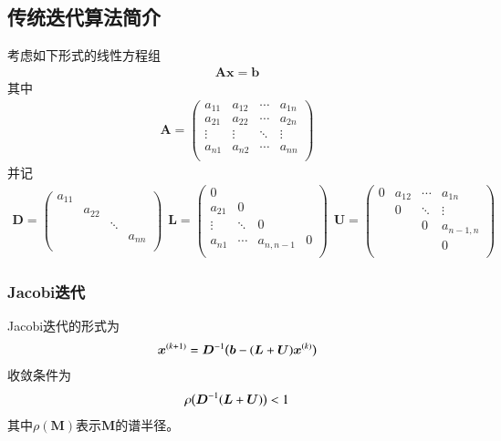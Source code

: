 \subsection{传统迭代算法简介}
考虑如下形式的线性方程组
\begin{align}
  \bm{A}\bm{x}=\bm{b}
\end{align}
其中
\begin{align}
  \bm{A}=\begin{pmatrix}
  a_{11} & a_{12} & \cdots & a_{1n}\\
  a_{21} & a_{22} & \cdots & a_{2n}\\
  \vdots & \vdots & \ddots & \vdots\\
  a_{n1} & a_{n2} & \cdots & a_{nn}\\
  \end{pmatrix}
\end{align}
并记
\begin{align}
  \bm{D}=\begin{pmatrix}
      a_{11} &  &  & \\
       & a_{22} &  & \\
       &  & \ddots & \\
       &  &  & a_{nn}\\
      \end{pmatrix}
  \hspace{5pt}
  \bm{L}=\begin{pmatrix}
    0 &  &  & \\
    a_{21} & 0 &  & \\
    \vdots & \ddots & 0 & \\
    a_{n1} & \cdots & a_{n,n-1} & 0\\
    \end{pmatrix}
  \hspace{5pt}
  \bm{U}=\begin{pmatrix}
      0 & a_{12} & \cdots & a_{1n}\\
       & 0 & \ddots & \vdots\\
       &  & 0 & a_{n-1,n}\\
       &  &  & 0\\
      \end{pmatrix}
\end{align}

\subsubsection{Jacobi迭代}
Jacobi迭代的形式为
\begin{align}
  \bm{x}^{(k+1)}=\bm{D}^{-1}\pb[b]{\bm{b}-\pb{\bm{L}+\bm{U}}\bm{x}^{(k)}}
\end{align}
收敛条件为
\begin{align}
  \rho\pb[b]{\bm{D}^{-1}\pb{\bm{L}+\bm{U}}}<1
\end{align}
其中$\rho(\bm{M})$表示$\bm{M}$的谱半径。\cite{golub2012matrix}

